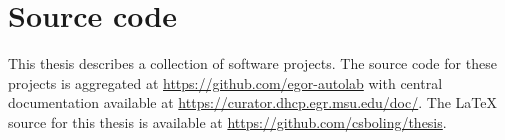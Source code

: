\section*{Source code}

This thesis describes a collection of software projects. The source
code for these projects is aggregated at
\url{https://github.com/egor-autolab} with central documentation
available at \url{https://curator.dhcp.egr.msu.edu/doc/}.  The \LaTeX
source for this thesis is available at
\url{https://github.com/csboling/thesis}.


